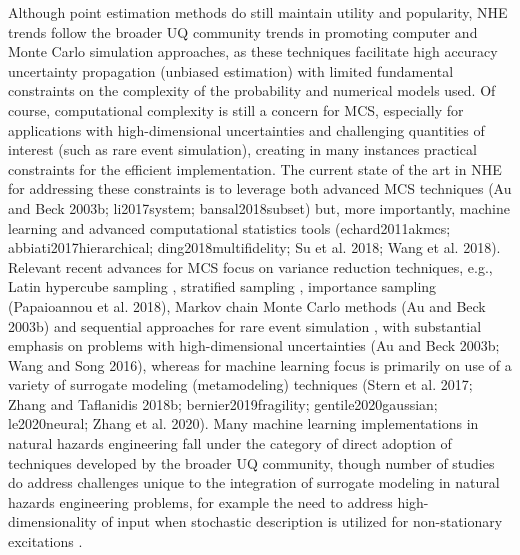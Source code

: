 Although point estimation methods do still maintain utility and popularity, NHE trends follow the broader UQ community trends in promoting computer and Monte Carlo simulation approaches, as these techniques facilitate high accuracy uncertainty propagation (unbiased estimation) with limited fundamental constraints on the complexity of the probability and numerical models used. Of course, computational complexity is still a concern for MCS, especially for applications with high-dimensional uncertainties and challenging quantities of interest (such as rare event simulation), creating in many instances practical constraints for the efficient implementation. The current state of the art in NHE for addressing these constraints is to leverage both advanced MCS techniques (Au and Beck 2003b; li2017system; bansal2018subset) but, more importantly, machine learning and advanced computational statistics tools (echard2011akmcs; abbiati2017hierarchical; ding2018multifidelity; Su et al. 2018; Wang et al. 2018). Relevant recent advances for MCS focus on variance reduction techniques, e.g., Latin hypercube sampling \citep{vamvatsikos2014seismic}, stratified sampling \citep{jayaram2010efficient}, importance sampling (Papaioannou et al. 2018), Markov chain Monte Carlo methods (Au and Beck 2003b) and sequential approaches for rare event simulation \citep{jia2017new}, with substantial emphasis on problems with high-dimensional uncertainties (Au and Beck 2003b; Wang and Song 2016), whereas for machine learning focus is primarily on use of a variety of surrogate modeling (metamodeling) techniques (Stern et al. 2017; Zhang and Taflanidis 2018b; bernier2019fragility; gentile2020gaussian; le2020neural; Zhang et al. 2020). Many machine learning implementations in natural hazards engineering fall under the category of direct adoption of techniques developed by the broader UQ community, though number of studies do address challenges unique to the integration of surrogate modeling in natural hazards engineering problems, for example the need to address high-dimensionality of input when stochastic description is utilized for non-stationary excitations \citep{gidaris2015kriging}.  

